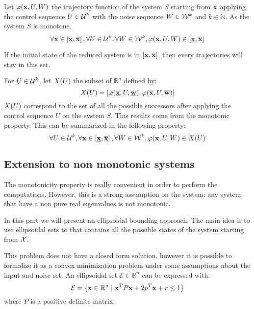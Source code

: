 Let $\varphi( \mathbf{x},U,W)$ the trajectory function of the system $S$ starting from $ \mathbf{x}$
applying the control sequence $U \in {\mathcal{U}}^k$
with the noise sequence $W \in {\mathcal{W}}^k$ and $k \in \mathbb{N}$.
As the system $S$ is monotone,
\begin{equation}
\forall  \mathbf{x} \in \left [\underline{ \mathbf{x}}, \overline{ \mathbf{x}} \right ],
\forall U \in {\mathcal{U}}^k,
\forall W \in {\mathcal{W}}^k,
\varphi ( \mathbf{x},U,W)
\in \left[ \underline{ \mathbf{x}}, \overline{ \mathbf{x}} \right]
\end{equation}

If the initial state of the reduced system is in $\left[ \underline{ \mathbf{x}}, \overline{ \mathbf{x}} \right]$, then every trajectories will stay in this set.

For $U \in \mathcal{U}^k$, let $X(U)$ the subset of $\mathbb{R}^n$ defined by:
\begin{equation}
X(U) = \left[ 
\varphi (\underline{ \mathbf{x}},U,\underline{ \mathbf{w}}),
\varphi (\overline{ \mathbf{x}},U,\overline{ \mathbf{w}})
\right]
\end{equation}
$X(U)$ correspond to the set of all the possible successors after applying the control sequence $U$ on the system $S$. This results come from the monotonic property.
This can be summarized in the following property:
\begin{equation}
\forall U \in \mathcal{U}^k,
\forall  \mathbf{x} \in \left[\underline{ \mathbf{x}}, \overline{ \mathbf{x}} \right],
\forall W \in \mathcal{W}^k,
\varphi ( \mathbf{x},U,W) \in X(U)
\end{equation}


\subsection{Extension to non monotonic systems}
The monotonicity property is really convenient in order to perform the computations.
However, this is a strong assumption on the system: any system that have a non pure real eigenvalues is not monotonic.

In this part we will present an ellipsoidal bounding approach.
The main idea is to use ellipsoidal sets to that contains all the possible states of the system starting from $\mathcal{X}$.

\newcommand{\ellipse}{\mathcal{E}}%
This problem does not have a closed form solution, however it is possible to formalize it as a convex minimization problem under some assumptions about the input and noise set.
An ellipsoidal set $\ellipse \in \mathbb{R}^n$ can be expressed with:
\begin{equation}
\ellipse  = \{\x \in \mathbb{R}^n \mid \x^T P \x + 2 p^T \x + r \leq 1 \} 
\end{equation}
where $P$ is a positive definite matrix.

